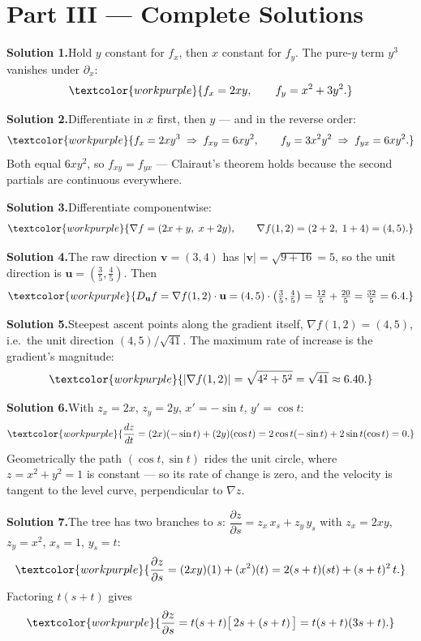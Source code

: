 \section*{Part III --- Complete Solutions}

\noindent\textbf{Solution 1.}\quad Hold $y$ constant for $f_x$, then $x$ constant
for $f_y$. The pure-$y$ term $y^3$ vanishes under $\partial_x$:
\[ \textcolor{workpurple}{f_x = 2xy, \qquad f_y = x^2 + 3y^2.} \]

\medskip
\noindent\textbf{Solution 2.}\quad Differentiate in $x$ first, then $y$ --- and
in the reverse order:
\[ \textcolor{workpurple}{f_x = 2xy^3 \;\Rightarrow\; f_{xy} = 6xy^2,
   \qquad f_y = 3x^2y^2 \;\Rightarrow\; f_{yx} = 6xy^2.} \]
Both equal $6xy^2$, so $f_{xy}=f_{yx}$ --- Clairaut's theorem holds because the
second partials are continuous everywhere.

\medskip
\noindent\textbf{Solution 3.}\quad Differentiate componentwise:
\[ \textcolor{workpurple}{\nabla f = (2x + y,\; x + 2y),
   \qquad \nabla f(1,2) = (2+2,\; 1+4) = (4,5).} \]

\medskip
\noindent\textbf{Solution 4.}\quad The raw direction $\mathbf v=(3,4)$ has
$\lvert\mathbf v\rvert=\sqrt{9+16}=5$, so the unit direction is
$\mathbf u=(\tfrac35,\tfrac45)$. Then
\[ \textcolor{workpurple}{D_{\mathbf u}f = \nabla f(1,2)\cdot\mathbf u
   = (4,5)\cdot\left(\tfrac35,\tfrac45\right)
   = \tfrac{12}{5} + \tfrac{20}{5} = \tfrac{32}{5} = 6.4.} \]

\medskip
\noindent\textbf{Solution 5.}\quad Steepest ascent points along the gradient
itself, $\nabla f(1,2)=(4,5)$, i.e.\ the unit direction
$(4,5)/\sqrt{41}$. The maximum rate of increase is the gradient's magnitude:
\[ \textcolor{workpurple}{\lvert\nabla f(1,2)\rvert = \sqrt{4^2+5^2}
   = \sqrt{41} \approx 6.40.} \]

\medskip
\noindent\textbf{Solution 6.}\quad With $z_x=2x$, $z_y=2y$, $x'=-\sin t$,
$y'=\cos t$:
\[ \textcolor{workpurple}{\frac{dz}{dt} = (2x)(-\sin t) + (2y)(\cos t)
   = 2\cos t(-\sin t) + 2\sin t(\cos t) = 0.} \]
Geometrically the path $(\cos t,\sin t)$ rides the unit circle, where
$z=x^2+y^2=1$ is constant --- so its rate of change is zero, and the velocity is
tangent to the level curve, perpendicular to $\nabla z$.

\medskip
\noindent\textbf{Solution 7.}\quad The tree has two branches to $s$:
$\dfrac{\partial z}{\partial s}=z_x\,x_s+z_y\,y_s$ with $z_x=2xy$, $z_y=x^2$,
$x_s=1$, $y_s=t$:
\[ \textcolor{workpurple}{\frac{\partial z}{\partial s}
   = (2xy)(1) + (x^2)(t)
   = 2(s+t)(st) + (s+t)^2\,t.} \]
Factoring $t(s+t)$ gives
\[ \textcolor{workpurple}{\frac{\partial z}{\partial s}
   = t(s+t)\big[\,2s + (s+t)\,\big] = t(s+t)(3s+t).} \]

